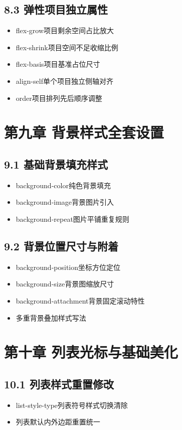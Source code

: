 \subsection{8.3 弹性项目独立属性}
\begin{itemize}[leftmargin=*]
\item flex-grow项目剩余空间占比放大
\item flex-shrink项目空间不足收缩比例
\item flex-basis项目基准占位尺寸
\item align-self单个项目独立侧轴对齐
\item order项目排列先后顺序调整
\end{itemize}

\section{第九章 背景样式全套设置}
\subsection{9.1 基础背景填充样式}
\begin{itemize}[leftmargin=*]
\item background-color纯色背景填充
\item background-image背景图片引入
\item background-repeat图片平铺重复规则
\end{itemize}

\subsection{9.2 背景位置尺寸与附着}
\begin{itemize}[leftmargin=*]
\item background-position坐标方位定位
\item background-size背景图缩放尺寸
\item background-attachment背景固定滚动特性
\item 多重背景叠加样式写法
\end{itemize}

\section{第十章 列表光标与基础美化}
\subsection{10.1 列表样式重置修改}
\begin{itemize}[leftmargin=*]
\item list-style-type列表符号样式切换清除
\item 列表默认内外边距重置统一
\end{itemize}

